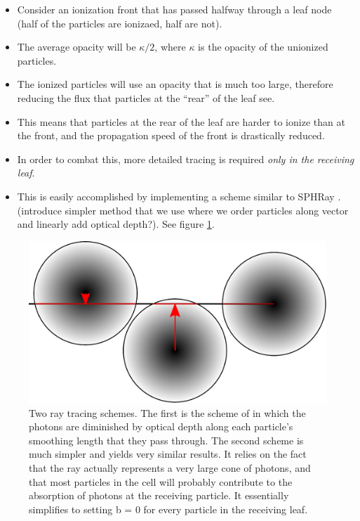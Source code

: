 \begin{itemize}
\item Consider an ionization front that has passed halfway through a leaf node (half of the particles are ionizaed, half are not).
\item The average opacity will be $\kappa/2$, where $\kappa$ is the opacity of the unionized particles.
\item The ionized particles will use an opacity that is much too large, therefore reducing the flux that particles at the ``rear'' of the leaf see.
\item This means that particles at the rear of the leaf are harder to ionize than at the front, and the propagation speed of the front is drastically reduced.
\item In order to combat this, more detailed tracing is required \emph{only in the receiving leaf}.
\item This is easily accomplished by implementing a scheme similar to SPHRay \citep{altayEt08}. (introduce simpler method that we use where we order particles along vector and linearly add optical depth?). See figure \ref{fig:particletracing}.
\end{itemize}

\begin{figure}
\includegraphics[width=\textwidth]{graphics/raytrace.eps}
\caption[Ray tracing schemes for receiving cells.]{Two ray tracing schemes. The first is the scheme of \citet{altayEt08} in which the photons are diminished by optical depth along each particle's smoothing length that they pass through. The second scheme is much simpler and yields very similar results. It relies on the fact that the ray actually represents a very large cone of photons, and that most particles in the cell will probably contribute to the absorption of photons at the receiving particle. It essentially simplifies to setting b = 0 for every particle in the receiving leaf.}
\label{fig:particletracing}
\end{figure}

